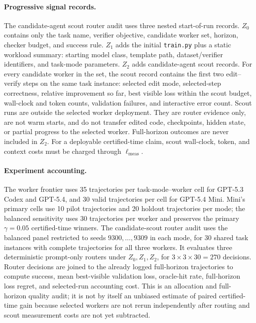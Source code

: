 \documentclass{article}
\begin{document}
\paragraph{Progressive signal records.}
The candidate-agent scout router audit uses three nested start-of-run records.
\(Z_0\) contains only the task name, verifier objective, candidate worker set, horizon, checker budget, and success rule.
\(Z_1\) adds the initial \texttt{train.py} plus a static workload summary: starting model class, template path, dataset/verifier identifiers, and task-mode parameters.
\(Z_2\) adds candidate-agent scout records.
For every candidate worker in the set, the scout record contains the first two edit--verify steps on the same task instance: selected edit mode, selected-step correctness, relative improvement so far, best visible loss within the scout budget, wall-clock and token counts, validation failures, and interactive error count.
Scout runs are outside the selected worker deployment.
They are router evidence only, are not warm starts, and do not transfer edited code, checkpoints, hidden state, or partial progress to the selected worker.
Full-horizon outcomes are never included in \(Z_2\).
For a deployable certified-time claim, scout wall-clock, token, and context costs must be charged through \(\ell_{\mathrm{meas}}\).

\paragraph{Experiment accounting.}
The worker frontier uses 35 trajectories per task-mode--worker cell for GPT-5.3 Codex and GPT-5.4, and 30 valid trajectories per cell for GPT-5.4 Mini.
Mini's primary cells use 10 pilot trajectories and 20 holdout trajectories per mode; the balanced sensitivity uses 30 trajectories per worker and preserves the primary \(\gamma=0.05\) certified-time winners.
The candidate-scout router audit uses the balanced panel restricted to seeds \(9300,\ldots,9309\) in each mode, for 30 shared task instances with complete trajectories for all three workers.
It evaluates three deterministic prompt-only routers under \(Z_0,Z_1,Z_2\), for \(3\times 3\times 30=270\) decisions.
Router decisions are joined to the already logged full-horizon trajectories to compute success, mean best-visible validation loss, oracle-hit rate, full-horizon loss regret, and selected-run accounting cost.
This is an allocation and full-horizon quality audit; it is not by itself an unbiased estimate of paired certified-time gain because selected workers are not rerun independently after routing and scout measurement costs are not yet subtracted.
\end{document}
